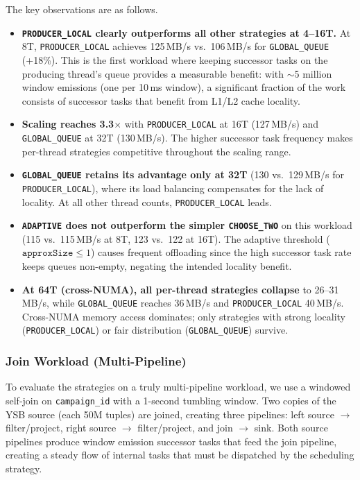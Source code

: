 The key observations are as follows.
%
\begin{itemize}
    \item \textbf{\texttt{PRODUCER\_LOCAL} clearly outperforms all other strategies at 4--16T.}
    At 8T, \texttt{PRODUCER\_LOCAL} achieves 125\,MB/s vs.\ 106\,MB/s for \texttt{GLOBAL\_QUEUE} (+18\%).
    This is the first workload where keeping successor tasks on the producing thread's queue provides a measurable benefit: with $\sim$5 million window emissions (one per 10\,ms window), a significant fraction of the work consists of successor tasks that benefit from L1/L2 cache locality.

    \item \textbf{Scaling reaches 3.3$\times$} with \texttt{PRODUCER\_LOCAL} at 16T (127\,MB/s) and \texttt{GLOBAL\_QUEUE} at 32T (130\,MB/s).
    The higher successor task frequency makes per-thread strategies competitive throughout the scaling range.

    \item \textbf{\texttt{GLOBAL\_QUEUE} retains its advantage only at 32T} (130 vs.\ 129\,MB/s for \texttt{PRODUCER\_LOCAL}), where its load balancing compensates for the lack of locality.
    At all other thread counts, \texttt{PRODUCER\_LOCAL} leads.

    \item \textbf{\texttt{ADAPTIVE} does not outperform the simpler \texttt{CHOOSE\_TWO}} on this workload (115 vs.\ 115\,MB/s at 8T, 123 vs.\ 122 at 16T).
    The adaptive threshold ($\texttt{approxSize} \leq 1$) causes frequent offloading since the high successor task rate keeps queues non-empty, negating the intended locality benefit.

    \item \textbf{At 64T (cross-NUMA), all per-thread strategies collapse} to 26--31\,MB/s, while \texttt{GLOBAL\_QUEUE} reaches 36\,MB/s and \texttt{PRODUCER\_LOCAL} 40\,MB/s.
    Cross-NUMA memory access dominates; only strategies with strong locality (\texttt{PRODUCER\_LOCAL}) or fair distribution (\texttt{GLOBAL\_QUEUE}) survive.
\end{itemize}

\subsubsection{Join Workload (Multi-Pipeline)}

To evaluate the strategies on a truly multi-pipeline workload, we use a windowed self-join on \texttt{campaign\_id} with a 1-second tumbling window.
Two copies of the YSB source (each 50M tuples) are joined, creating three pipelines: left source $\rightarrow$ filter/project, right source $\rightarrow$ filter/project, and join $\rightarrow$ sink.
Both source pipelines produce window emission successor tasks that feed the join pipeline, creating a steady flow of internal tasks that must be dispatched by the scheduling strategy.

